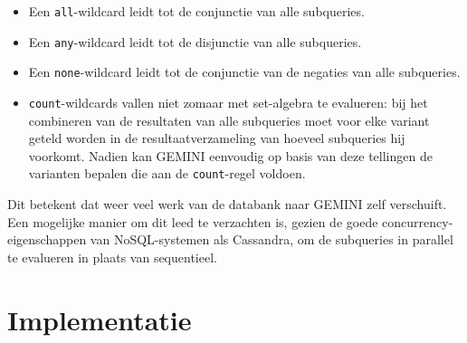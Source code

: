\begin{itemize}
\item Een \texttt{all}-wildcard leidt tot de conjunctie van alle subqueries.
\item Een \texttt{any}-wildcard leidt tot de disjunctie van alle subqueries.
\item Een \texttt{none}-wildcard leidt tot de conjunctie van de negaties van alle subqueries.
\item \texttt{count}-wildcards vallen niet zomaar met set-algebra te evalueren: bij het combineren van de resultaten van alle subqueries moet voor elke variant geteld worden in de resultaatverzameling van hoeveel subqueries hij voorkomt. Nadien kan GEMINI eenvoudig op basis van deze tellingen de varianten bepalen die aan de \texttt{count}-regel voldoen.
\end{itemize}

Dit betekent dat weer veel werk van de databank naar GEMINI zelf verschuift. Een mogelijke manier om dit leed te verzachten is, gezien de goede concurrency-eigenschappen van NoSQL-systemen als Cassandra, om de subqueries in parallel te evalueren in plaats van sequentieel.

\section{Implementatie}
